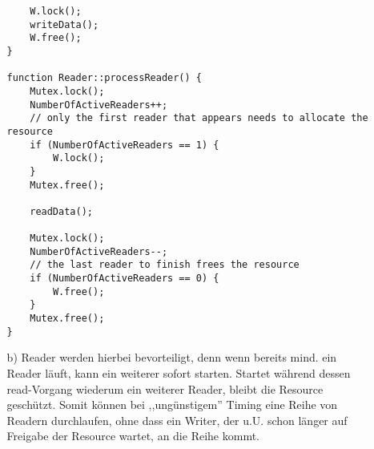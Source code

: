 \documentclass[a4paper,11pt]{article}
\begin{document}
\begin{enumerate}
\begin{itemize}
\begin{verbatim}
    W.lock();
    writeData();
    W.free();
}

function Reader::processReader() {
    Mutex.lock();
    NumberOfActiveReaders++;
    // only the first reader that appears needs to allocate the resource
    if (NumberOfActiveReaders == 1) {
        W.lock();
    }
    Mutex.free();

    readData();

    Mutex.lock();
    NumberOfActiveReaders--;
    // the last reader to finish frees the resource
    if (NumberOfActiveReaders == 0) {
        W.free();
    }
    Mutex.free();
}
        \end{verbatim}

    \item[b)]
        Reader werden hierbei bevorteiligt, denn wenn bereits mind. ein Reader läuft, kann ein weiterer sofort starten. Startet während dessen read-Vorgang
        wiederum ein weiterer Reader, bleibt die Resource geschützt. Somit können bei ,,ungünstigem'' Timing eine Reihe von Readern durchlaufen, ohne dass ein Writer, der u.U. schon länger auf Freigabe der Resource wartet, an die Reihe kommt.

\end{itemize}

\end{enumerate}
\end{document}

